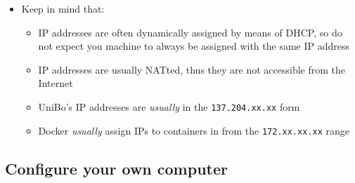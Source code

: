 \documentclass[handout]{beamer}\mode<presentation>{\usetheme{AMSCesenaBleu}}
\begin{document}
\begin{frame}[allowframebreaks]
    \framebreak
    \begin{itemize}
    \item Keep in mind that:
    \begin{itemize}
    	\item IP addresses are often dynamically assigned by means of DHCP, so \alert{do not expect} you machine to always be assigned with the same IP address
    	\item IP addresses are usually NATted, thus they are not accessible from the Internet
    	\item UniBo's IP addresses are \emph{usually} in the \texttt{137.204.xx.xx} form
    	\item Docker \emph{usually} assign IPs to containers in from the \texttt{172.xx.xx.xx} range
    \end{itemize}
	\end{itemize}

\end{frame}

\subsection{Configure your own computer}
\end{document}
